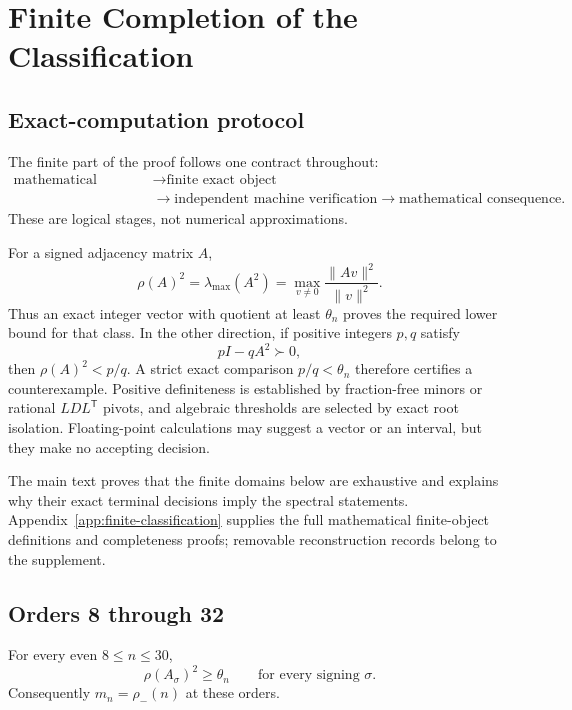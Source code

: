 \section{Finite Completion of the Classification}
\label{sec:finite-completion}

\subsection{Exact-computation protocol}
\label{subsec:exact-computation-protocol}

The finite part of the proof follows one contract throughout:
\[
\begin{aligned}
\text{mathematical reduction}
&\longrightarrow \text{finite exact object}\\
&\longrightarrow \text{independent machine verification}
\longrightarrow \text{mathematical consequence}.
\end{aligned}
\]
These are logical stages, not numerical approximations.

For a signed adjacency matrix \(A\),
\[
\rho(A)^2=\lambda_{\max}(A^2)
=\max_{v\neq0}\frac{\|Av\|^2}{\|v\|^2}.
\]
Thus an exact integer vector with quotient at least \(\theta_n\) proves the
required lower bound for that class.  In the other direction, if positive
integers \(p,q\) satisfy
\[
pI-qA^2\succ0,
\]
then \(\rho(A)^2<p/q\).  A strict exact comparison
\(p/q<\theta_n\) therefore certifies a counterexample.  Positive
definiteness is established by fraction-free minors or rational
\(LDL^{\mathsf T}\) pivots, and algebraic thresholds are selected by exact
root isolation.  Floating-point calculations may suggest a vector or an
interval, but they make no accepting decision.

The main text proves that the finite domains below are exhaustive and
explains why their exact terminal decisions imply the spectral statements.
Appendix~\ref{app:finite-classification} supplies the full mathematical
finite-object definitions and completeness proofs; removable reconstruction
records belong to the supplement.

\subsection{Orders 8 through 32}
\label{subsec:orders-8-32}

\begin{proposition}\label{prop:orders-8-30}
For every even \(8\leq n\leq30\),
\[
\rho(A_\sigma)^2\geq\theta_n
\qquad\text{for every signing }\sigma.
\]
Consequently \(m_n=\rho_-(n)\) at these orders.
\end{proposition}

